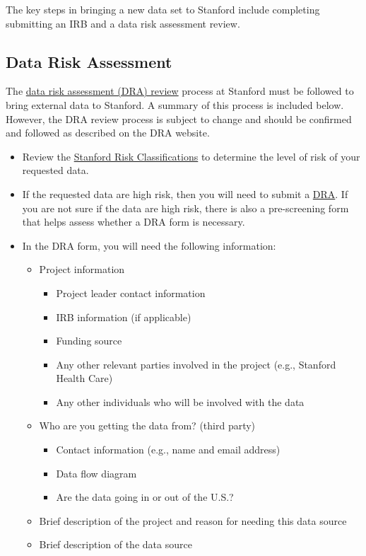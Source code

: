 \documentclass[
]{book}
\providecommand{\tightlist}{%
  \setlength{\itemsep}{0pt}\setlength{\parskip}{0pt}}
\begin{document}
The key steps in bringing a new data set to Stanford include completing submitting an IRB and a data risk assessment review.

\hypertarget{data-risk-assessment}{%
\subsection{Data Risk Assessment}\label{data-risk-assessment}}

The \href{https://uit.stanford.edu/security/dra}{data risk assessment (DRA) review} process at Stanford must be followed to bring external data to Stanford. A summary of this process is included below. However, the DRA review process is subject to change and should be confirmed and followed as described on the DRA website.

\begin{itemize}
\tightlist
\item
  Review the \href{https://uit.stanford.edu/guide/riskclassifications}{Stanford Risk Classifications} to determine the level of risk of your requested data.
\item
  If the requested data are high risk, then you will need to submit a \href{https://uit.stanford.edu/security/dra}{DRA}. If you are not sure if the data are high risk, there is also a pre-screening form that helps assess whether a DRA form is necessary.
\item
  In the DRA form, you will need the following information:

  \begin{itemize}
  \tightlist
  \item
    Project information

    \begin{itemize}
    \tightlist
    \item
      Project leader contact information
    \item
      IRB information (if applicable)
    \item
      Funding source
    \item
      Any other relevant parties involved in the project (e.g., Stanford Health Care)
    \item
      Any other individuals who will be involved with the data
    \end{itemize}
  \item
    Who are you getting the data from? (third party)

    \begin{itemize}
    \tightlist
    \item
      Contact information (e.g., name and email address)
    \item
      Data flow diagram
    \item
      Are the data going in or out of the U.S.?
    \end{itemize}
  \item
    Brief description of the project and reason for needing this data source
  \item
    Brief description of the data source


\end{itemize}
\end{itemize}
\end{document}
